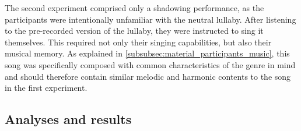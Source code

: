 The second experiment comprised only a shadowing performance, as the participants were intentionally unfamiliar with the neutral lullaby.
After listening to the pre-recorded version of the lullaby, they were instructed to sing it themselves.
This required not only their singing capabilities, but also their musical memory.
As explained in \cref{subsubsec:material_participants_music}, this song was specifically composed with common characteristics of the genre in mind and should therefore contain similar melodic and harmonic contents to the song in the first experiment.


\subsection{Analyses and results}
\label{subsec:results_music}

